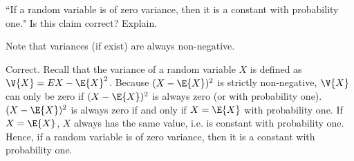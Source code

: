 	\begin{exercise}\label{ex:chap06:05}
		``If a random variable is of zero variance, then it is a constant with probability one." Is this claim correct? Explain.
		\begin{hint}
			Note that variances (if exist) are always non-negative.
		\end{hint}
		\begin{solution}
			Correct. Recall that the variance of a random variable $X$ is defined as $\V{X} = E{X - \E{X}}^2$. Because $(X - \E{X})^2$ is strictly non-negative, $\V{X}$ can only be zero if $(X - \E{X})^2$ is always zero (or with probability one). $(X - \E{X})^2$ is always zero if and only if $X = \E{X}$ with probability one. If $X = \E{X}$, $X$ always has the same value, i.e. is constant with probability one. Hence, if a random variable is of zero variance, then it is a constant with probability one.
		\end{solution}
	\end{exercise}

